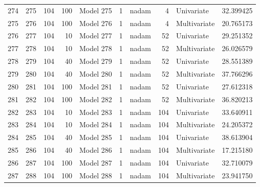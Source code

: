\begin{tabular}{lrrrlrlrlr}
274 & 275 & 104 & 100 & Model 275 & 1 & nadam & 4 & Univariate & 32.399425 \\
275 & 276 & 104 & 100 & Model 276 & 1 & nadam & 4 & Multivariate & 20.765173 \\
276 & 277 & 104 & 10 & Model 277 & 1 & nadam & 52 & Univariate & 29.251352 \\
277 & 278 & 104 & 10 & Model 278 & 1 & nadam & 52 & Multivariate & 26.026579 \\
278 & 279 & 104 & 40 & Model 279 & 1 & nadam & 52 & Univariate & 28.551389 \\
279 & 280 & 104 & 40 & Model 280 & 1 & nadam & 52 & Multivariate & 37.766296 \\
280 & 281 & 104 & 100 & Model 281 & 1 & nadam & 52 & Univariate & 27.612318 \\
281 & 282 & 104 & 100 & Model 282 & 1 & nadam & 52 & Multivariate & 36.820213 \\
282 & 283 & 104 & 10 & Model 283 & 1 & nadam & 104 & Univariate & 33.640911 \\
283 & 284 & 104 & 10 & Model 284 & 1 & nadam & 104 & Multivariate & 24.205372 \\
284 & 285 & 104 & 40 & Model 285 & 1 & nadam & 104 & Univariate & 38.613904 \\
285 & 286 & 104 & 40 & Model 286 & 1 & nadam & 104 & Multivariate & 17.215180 \\
286 & 287 & 104 & 100 & Model 287 & 1 & nadam & 104 & Univariate & 32.710079 \\
287 & 288 & 104 & 100 & Model 288 & 1 & nadam & 104 & Multivariate & 23.941750 \\
\end{tabular}
